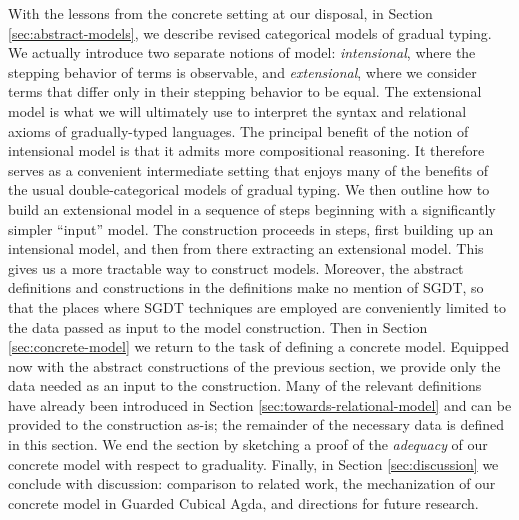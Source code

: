 
With the lessons from the concrete setting at our disposal, in Section
\ref{sec:abstract-models}, we describe revised categorical models of gradual
typing. We actually introduce two separate notions of model: \emph{intensional},
where the stepping behavior of terms is observable, and \emph{extensional},
where we consider terms that differ only in their stepping behavior to be equal.
The extensional model is what we will ultimately use to interpret the syntax and
relational axioms of gradually-typed languages. The principal benefit of the
notion of intensional model is that it admits more compositional reasoning. It
therefore serves as a convenient intermediate setting that enjoys many of the
benefits of the usual double-categorical models of gradual typing.
We then outline how to build an extensional model in a sequence of steps beginning
with a significantly simpler ``input'' model. The construction proceeds in
steps, first building up an intensional model, and then from there extracting an
extensional model.
This gives us a more tractable way to construct models.
Moreover, the abstract definitions and constructions in the definitions make no
mention of SGDT, so that the places where SGDT techniques are employed are
conveniently limited to the data passed as input to the model construction.
%
%
%
Then in Section \ref{sec:concrete-model} we return to the task of defining a
concrete model. Equipped now with the abstract constructions of the previous
section, we provide only the data needed as an input to the construction. Many
of the relevant definitions have already been introduced in Section
\ref{sec:towards-relational-model} and can be provided to the construction
as-is; the remainder of the necessary data is defined in this section.
%
We end the section by sketching a proof of the \emph{adequacy} of our concrete
model with respect to graduality.
%
Finally, in Section \ref{sec:discussion} we conclude with discussion: comparison
to related work, the mechanization of our concrete model in Guarded Cubical
Agda, and directions for future research.





